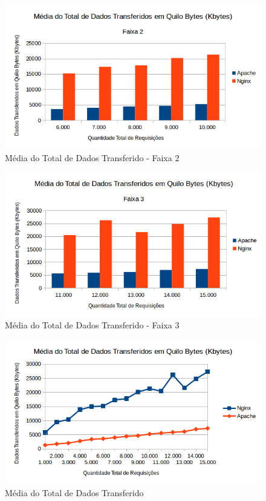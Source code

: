 \begin{figure}[H]
	\centering
	\includegraphics[width=1\linewidth]{graficos/grafico2-f2} 
	\caption{Média do Total de Dados Transferido - Faixa 2}
	\label{fig:grafico2-f2}
\end{figure}

\begin{figure}[H]
	\centering
	\includegraphics[width=1\linewidth]{graficos/grafico2-f3} 
	\caption{Média do Total de Dados Transferido - Faixa 3}
	\label{fig:grafico2-f3}
\end{figure}

\begin{figure}[H]
	\centering
	\includegraphics[width=1\linewidth]{graficos/grafico2} 
	\caption{Média do Total de Dados Transferido}
	\label{fig:grafico2}
\end{figure}

